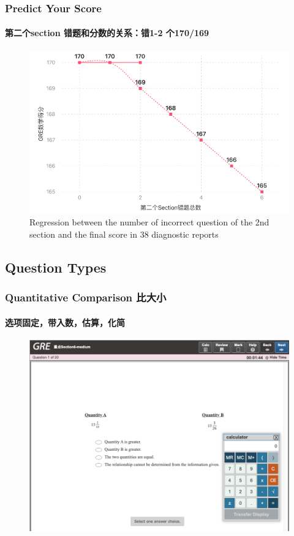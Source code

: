 \documentclass[
	11pt, %
]{beamer}
\begin{document}
\begin{frame}
	\frametitle{Predict Your Score}
	\framesubtitle{第二个section 错题和分数的关系：错1-2 个170/169}
	
	\begin{figure}
		\includegraphics[width=0.9\linewidth]{scoring.png}
		\caption{Regression between the number of incorrect question of the 2nd section and the final score in 38 diagnostic reports}
	\end{figure}
\end{frame}






\subsection{Question Types}


\begin{frame}
	\frametitle{Quantitative Comparison 比大小}
	\framesubtitle{选项固定，带入数，估算，化简}
	
	\begin{figure}
		\includegraphics[width=0.9\linewidth]{Quantitative_Comparison.png}
	\end{figure}
\end{frame}
\end{document}
